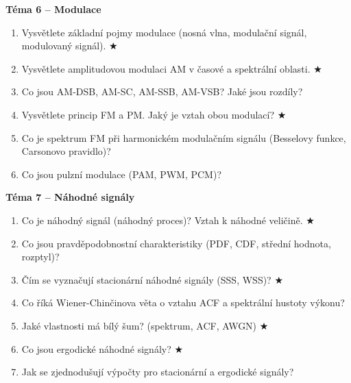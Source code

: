 \documentclass[12pt,a4paper]{article}
\begin{document}
\begin{tcolorbox}[colback=tmavemodr!5,colframe=tmavemodr!60,
    title={\bfseries\color{white} Kompletní seznam všech otázek ke zkoušce},
    fonttitle=\large, breakable]
\medskip
\textbf{\color{tmavemodr}Téma 6 – Modulace}
\begin{enumerate}[resume, itemsep=2pt, label=\arabic*.]
  \item Vysvětlete základní pojmy modulace (nosná vlna, modulační signál, modulovaný signál). $\bigstar$
  \item Vysvětlete amplitudovou modulaci AM v časové a spektrální oblasti. $\bigstar$
  \item Co jsou AM-DSB, AM-SC, AM-SSB, AM-VSB? Jaké jsou rozdíly?
  \item Vysvětlete princip FM a PM. Jaký je vztah obou modulací? $\bigstar$
  \item Co je spektrum FM při harmonickém modulačním signálu (Besselovy funkce, Carsonovo pravidlo)?
  \item Co jsou pulzní modulace (PAM, PWM, PCM)?
\end{enumerate}

\medskip
\textbf{\color{tmavemodr}Téma 7 – Náhodné signály}
\begin{enumerate}[resume, itemsep=2pt, label=\arabic*.]
  \item Co je náhodný signál (náhodný proces)? Vztah k náhodné veličině. $\bigstar$
  \item Co jsou pravděpodobnostní charakteristiky (PDF, CDF, střední hodnota, rozptyl)?
  \item Čím se vyznačují stacionární náhodné signály (SSS, WSS)? $\bigstar$
  \item Co říká Wiener-Chinčinova věta o vztahu ACF a spektrální hustoty výkonu?
  \item Jaké vlastnosti má bílý šum? (spektrum, ACF, AWGN) $\bigstar$
  \item Co jsou ergodické náhodné signály? $\bigstar$
  \item Jak se zjednodušují výpočty pro stacionární a ergodické signály?
\end{enumerate}

\end{tcolorbox}
\end{document}
